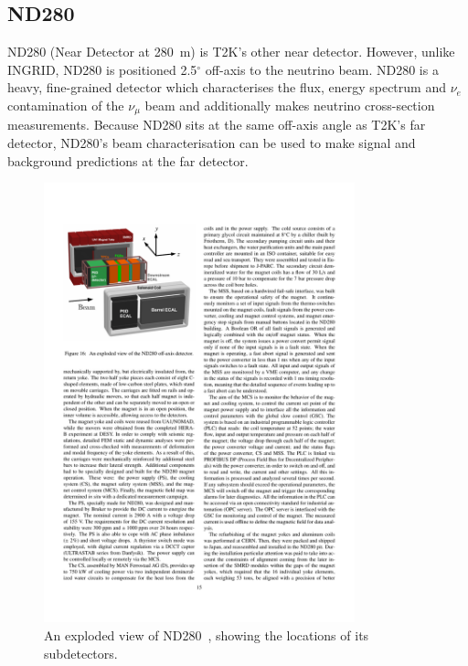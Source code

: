 \subsection{ND280}
\label{subsec:ND280}
ND280 (Near Detector at 280~m) is T2K's other near detector.  However, unlike INGRID, ND280 is positioned 2.5$^\circ$ off-axis to the neutrino beam.  ND280 is a heavy, fine-grained detector  which characterises the flux, energy spectrum and $\nu_e$ contamination of the $\nu_\mu$ beam and additionally makes neutrino cross-section measurements.  Because ND280 sits at the same off-axis angle as T2K's far detector, ND280's beam characterisation can be used to make signal and background predictions at the far detector.
\begin{figure}
  \centering
  \includegraphics[width=9cm]{images/t2k/ND280Schematic.pdf}
  \caption{An exploded view of ND280~\cite{Abe2011106}, showing the locations of its subdetectors.}
  \label{fig:ND280Schematic}
\end{figure}
\newline
\newline
